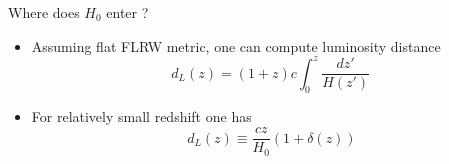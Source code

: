 \documentclass{beamer}
\newcommand{\second}{\mathrm{s}}
\begin{document}
\begin{frame}{Where does $H_0$ enter ?}

\begin{itemize}
\item[] Assuming flat FLRW metric, one can compute luminosity distance
\begin{equation*}\label{Eq:luminosity-distance-the}
d_L(z) = (1+z) c \int_0^z \frac{dz'}{H(z')} \, 
\end{equation*}
\item[] For relatively small redshift one has
\begin{equation*}\label{Eq:luminosity-distance-the-small-z}
d_L(z) \equiv \frac{cz}{H_0}  ( 1+\delta(z)) %
\end{equation*}

\end{itemize}
\end{frame}
\end{document}
